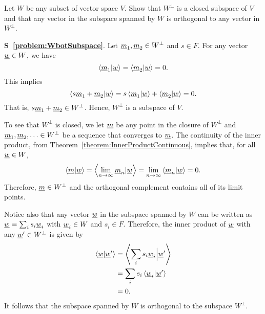 \begin{problem} \label{problem:WbotSubspace}
Let $W$ be any subset of vector space $V$.
Show that $W^{\bot}$ is a closed subspace of $V$ and that any vector in the subspace spanned by $W$ is orthogonal to any vector in $W^{\bot}$.
\end{problem}
\noindent
\textbf{S~\ref{problem:WbotSubspace}}.
Let $\underline{m}_1, \underline{m}_2 \in W^{\bot}$ and $s \in F$.
For any vector $\underline{w} \in W$, we have
\begin{equation*}
\left\langle \underline{m}_1 | \underline{w} \right\rangle
= \left\langle \underline{m}_2 | \underline{w} \right\rangle
= 0.
\end{equation*}
This implies
\begin{equation*}
\left\langle s \underline{m}_1 + \underline{m}_2 | \underline{w} \right\rangle
= s \left\langle \underline{m}_1 | \underline{w} \right\rangle
+ \left\langle \underline{m}_2 | \underline{w} \right\rangle
= 0.
\end{equation*}
That is, $s \underline{m}_1 + \underline{m}_2 \in W^{\bot}$.
Hence, $W^{\bot}$ is a subspace of $V$.

To see that $W^{\bot}$ is closed, we let $\underline{m}$ be any point in the closure of $W^{\bot}$ and $\underline{m}_1,\underline{m}_2,\ldots \in W^{\bot}$ be a sequence that converges to $\underline{m}$.
The continuity of the inner product, from Theorem~\ref{theorem:InnerProductContinuous}, implies that, for all $\underline{w}\in W$,
\[ \left\langle \underline{m} | \underline{w} \right\rangle =  \left\langle \lim_{n\rightarrow\infty} \underline{m}_n | \underline{w}  \right\rangle  =  \lim_{n\rightarrow\infty}  \left\langle \underline{m}_n | \underline{w}  \right\rangle = 0. \]
Therefore, $\underline{m} \in W^{\bot}$ and the orthogonal complement contains all of its limit points.

Notice also that any vector $\underline{w}$ in the subspace spanned by $W$ can be written as $\underline{w} = \sum_{i} s_i \underline{w}_i$ with $\underline{w}_i \in W$ and $s_i \in F$.
Therefore, the inner product of $\underline{w}$ with any $\underline{w}' \in W^{\bot}$ is given by
\begin{align*}
\left\langle \underline{w} | \underline{w}' \right\rangle
&= \left\langle \sum_{i} s_i \underline{w}_i \Big| \underline{w}' \right\rangle \\
&= \sum_{i} s_i \left\langle \underline{w}_i | \underline{w}' \right\rangle \\
&= 0.
\end{align*}
It follows that the subspace spanned by $W$ is orthogonal to the subspace $W^{\bot}$.

